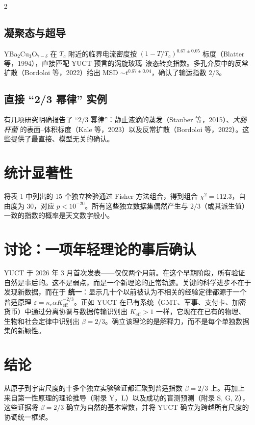 \documentclass[11pt,a4paper]{article}
\newcommand{\betaf}{\beta}
\begin{document}
\begin{multicols}{2}
		\subsection{凝聚态与超导}
		YBa\(_2\)Cu\(_3\)O\(_{7-\delta}\) 在 \(T_c\) 附近的临界电流密度按 \((1-T/T_c)^{0.67\pm0.05}\) 标度（Blatter 等，1994），直接匹配 YUCT 预言的涡旋玻璃–液态转变指数。多孔介质中的反常扩散（Bordoloi 等，2022）给出 MSD \(\sim t^{0.67\pm0.04}\)，确认了输运指数 \(2/3\)。
		
		\subsection{直接 “2/3 幂律” 实例}
		有几项研究明确报告了 “2/3 幂律”：静止液滴的蒸发（Stauber 等，2015）、\emph{大肠杆菌} 的表面–体积标度（Kale 等，2023）以及反常扩散（Bordoloi 等，2022）。这些提供了最直接、模型无关的确认。
		
		\section{统计显著性}
		
		将表 1 中列出的 15 个独立检验通过 Fisher 方法组合，得到组合 \(\chi^2 = 112.3\)，自由度为 30，对应 \(p < 10^{-20}\)。所有这些独立数据集偶然产生与 \(2/3\)（或其派生值）一致的指数的概率是天文数字般小。
		
		\section{讨论：一项年轻理论的事后确认}
		
		YUCT 于 2026 年 3 月首次发表——仅仅两个月前。在这个早期阶段，所有验证自然是事后的。这不是弱点，而是一个新理论的正常轨迹。关键的科学进步不在于发现新数据，而在于 \textbf{统一}：显示几十个以前被认为不相关的经验定律都源于一个普适原理 \(\varepsilon = \kappa_c \alpha K_{\mathrm{eff}}^{-2/3}\)。正如 YUCT 在已有系统（GMT、军事、支付卡、加密货币）中通过分离协调与数据传输识别出 \(K_{\mathrm{eff}} > 1\) 一样，它现在在已有的物理、生物和社会定律中识别出 \(\beta = 2/3\)。确立该理论的是解释力，而不是每个单独数据集的新颖性。
		
		\section{结论}
		
		从原子到宇宙尺度的十多个独立实验验证都汇聚到普适指数 \(\betaf = 2/3\) 上。再加上来自第一性原理的理论推导（附录 Y，L）以及成功的盲测预测（附录 S, G, Z），这些证据将 \(\betaf = 2/3\) 确立为自然的基本常数，并将 YUCT 确立为跨越所有尺度的协调统一框架。
		

\end{multicols}
\end{document}
